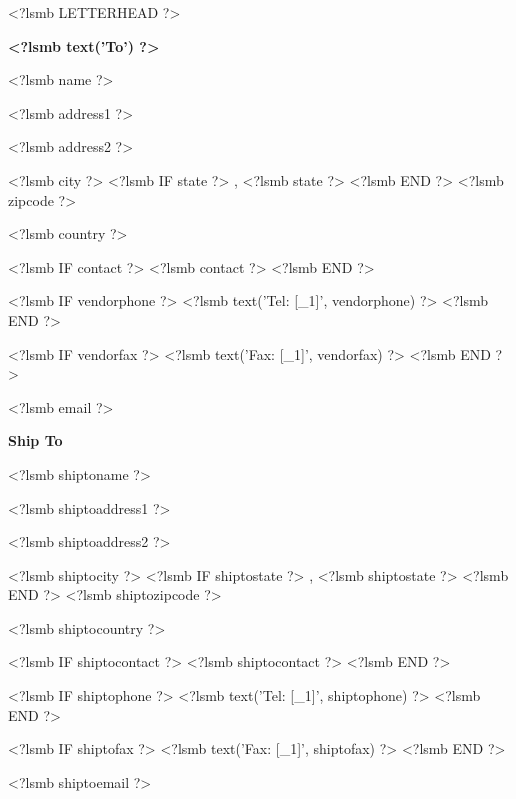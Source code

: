 \documentclass{scrartcl}
\begin{document}
\pagestyle{myheadings}
\thispagestyle{empty}

\fontsize{10pt}{12pt}\selectfont

<?lsmb LETTERHEAD ?>




\vspace*{0.5cm}

\parbox[t]{.5\textwidth}{
\textbf{<?lsmb text('To') ?>}
\vspace{0.3cm}

<?lsmb name ?>

<?lsmb address1 ?>

<?lsmb address2 ?>

<?lsmb city ?>
<?lsmb IF state ?>
\hspace{-0.1cm}, <?lsmb state ?>
<?lsmb END ?>
<?lsmb zipcode ?>

<?lsmb country ?>

\vspace{0.3cm}

<?lsmb IF contact ?>
<?lsmb contact ?>
\vspace{0.2cm}
<?lsmb END ?>

<?lsmb IF vendorphone ?>
<?lsmb text('Tel: [_1]', vendorphone) ?>
<?lsmb END ?>

<?lsmb IF vendorfax ?>
<?lsmb text('Fax: [_1]', vendorfax) ?>
<?lsmb END ?>

<?lsmb email ?>
}
\parbox[t]{.5\textwidth}{
\textbf{Ship To}
\vspace{0.3cm}

<?lsmb shiptoname ?>

<?lsmb shiptoaddress1 ?>

<?lsmb shiptoaddress2 ?>

<?lsmb shiptocity ?>
<?lsmb IF shiptostate ?>
\hspace{-0.1cm}, <?lsmb shiptostate ?>
<?lsmb END ?>
<?lsmb shiptozipcode ?>

<?lsmb shiptocountry ?>

\vspace{0.3cm}

<?lsmb IF shiptocontact ?>
<?lsmb shiptocontact ?>
\vspace{0.2cm}
<?lsmb END ?>

<?lsmb IF shiptophone ?>
<?lsmb text('Tel: [_1]', shiptophone) ?>
<?lsmb END ?>

<?lsmb IF shiptofax ?>
<?lsmb text('Fax: [_1]', shiptofax) ?>
<?lsmb END ?>

<?lsmb shiptoemail ?>
}
\hfill
\end{document}
